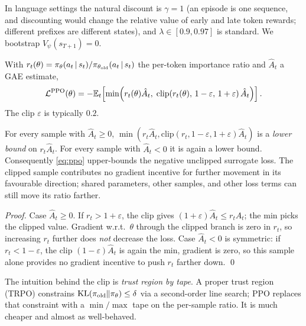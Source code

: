 \documentclass[11pt,oneside]{scrbook}
\begin{document}
In language settings the natural discount is $\gamma = 1$ (an episode
is one sequence, and discounting would change the relative value of
early and late token rewards; different prefixes are different states), and $\lambda \in [0.9, 0.97]$ is standard. We
bootstrap $V_\psi(s_{T+1}) = 0$.

\begin{definition}
\label{def:ppo}
With $r_t(\theta) = \pi_\theta(a_t \,\vert\, s_t) / \pi_{\theta_{\text{old}}}(a_t \,\vert\, s_t)$
the per-token importance ratio and $\hat A_t$ a GAE estimate,
\begin{equation}
\mathcal{L}^{\text{PPO}}(\theta)
  = -\mathbb{E}_t\!\left[\min\!\left(r_t(\theta)\hat A_t,\;
      \mathrm{clip}\!\left(r_t(\theta),\, 1-\varepsilon,\, 1+\varepsilon\right) \hat A_t\right)\right].
\label{eq:ppo}
\end{equation}
The clip $\varepsilon$ is typically $0.2$.
\end{definition}

\begin{theorem}
\label{thm:clip-pessimism}
For every sample with $\hat A_t \ge 0$, $\min(r_t \hat A_t,
\mathrm{clip}(r_t, 1-\varepsilon, 1+\varepsilon) \hat A_t)$ is a
\emph{lower bound} on $r_t \hat A_t$. For every sample with $\hat A_t
< 0$ it is again a lower bound. Consequently \eqref{eq:ppo} upper-bounds the negative unclipped surrogate loss. The clipped sample contributes no gradient incentive for further movement in its favourable direction; shared parameters, other samples, and other loss terms can still move its ratio farther.
\end{theorem}
\begin{proof}
Case $\hat A_t \ge 0$. If $r_t > 1+\varepsilon$, the clip gives
$(1+\varepsilon)\hat A_t \le r_t \hat A_t$; the min picks the clipped
value. Gradient w.r.t.\ $\theta$ through the clipped branch is zero
in $r_t$, so increasing $r_t$ further does \emph{not} decrease the
loss. Case $\hat A_t < 0$ is symmetric: if $r_t < 1-\varepsilon$, the
clip $(1-\varepsilon)\hat A_t$ is again the min, gradient is zero, so this sample alone provides no gradient incentive to push $r_t$ farther down. \qed
\end{proof}

\begin{intuition}
The intuition behind the clip is \emph{trust region by tape}. A
proper trust region (TRPO) constrains $\mathrm{KL}(\pi_{\text{old}} \| \pi_\theta)
\le \delta$ via a second-order line search; PPO replaces that
constraint with a $\min/\max$ tape on the per-sample ratio. It is much
cheaper and almost as well-behaved.
\end{intuition}
\end{document}

